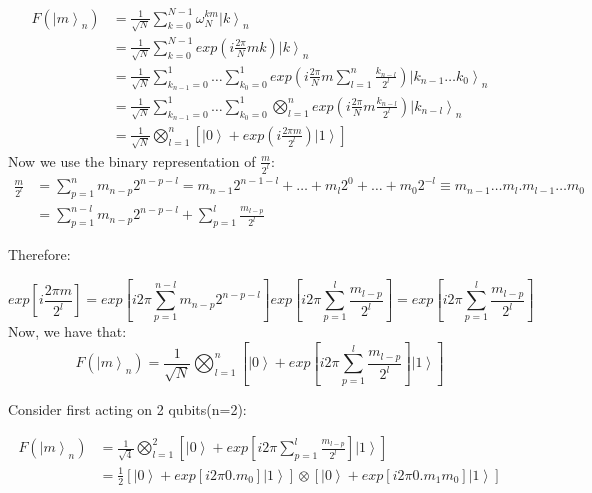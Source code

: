 \begin{equation}
\begin{split}
F\left(\left| m \right> _n\right) & = \frac{1}{\sqrt N} \sum_{k=0}^{N-1} \omega_N^{km} \left| k \right>_n \\
  & =  \frac{1}{\sqrt N} \sum_{k=0}^{N-1} exp\left( i \frac{2\pi}{N} mk \right) \left| k \right>_n  \\
  & =  \frac{1}{\sqrt N} \sum_{k_{n-1}=0}^{1} \dots \sum_{k_{0}=0}^{1} exp\left( i \frac{2\pi}{N} m \sum_{l=1}^n \frac{k_{n-l}}{2^l} \right) \left| k_{n-1} \dots k_0 \right>_n  \\
  & =  \frac{1}{\sqrt N} \sum_{k_{n-1}=0}^{1} \dots \sum_{k_{0}=0}^{1} \bigotimes_{l=1}^n exp\left( i \frac{2\pi}{N} m  \frac{k_{n-l}}{2^l} \right) \left| k_{n-l}\right>_n \\ 
  & =  \frac{1}{\sqrt N} \bigotimes_{l=1}^n \left[ \left| 0 \right> + exp\left( i \frac{2\pi m}{2^l} \right) \left| 1\right> \right]
\end{split}
\end{equation}
Now we use the binary representation of $\frac{m}{2^l}$: 
\begin{equation}
\begin{split}
\frac{m}{2^l} & = \sum_{p=1}^n m_{n-p} 2^{n-p-l}  = m_{n-1} 2^{n-1-l} + \dots + m_l 2^0 + \dots + m_0 2^{-l}  \equiv m_{n-1} \dots m_l . m_{l-1} \dots m_0 \\
 & = \sum_{p=1}^{n-l} m_{n-p} 2^{n-p-l} + \sum_{p=1}^{l} \frac{m_{l-p}}{2^l}  
\end{split}
\end{equation}

Therefore:

\begin{equation}
	exp\left[ i \frac{2 \pi m}{2^l} \right] = exp\left[ i 2 \pi \sum_{p=1}^{n-l} m_{n-p} 2^{n-p-l} \right] exp\left[i 2 \pi  \sum_{p=1}^{l} \frac{m_{l-p}}{2^l} \right] = exp\left[i 2 \pi  \sum_{p=1}^{l} \frac{m_{l-p}}{2^l} \right]
\end{equation}
Now, we have that:
\begin{equation}
F(\left| m\right>_n) = \frac{1}{\sqrt{N}} \bigotimes_{l=1}^n \left[ \left| 0 \right> +exp\left[i 2 \pi  \sum_{p=1}^{l} \frac{m_{l-p}}{2^l} \right] \left| 1\right> \right]
\end{equation}

Consider first acting on 2 qubits(n=2):

\begin{equation}
\begin{split}
F(\left| m\right>_n) & =  \frac{1}{\sqrt{4}} \bigotimes_{l=1}^2 \left[ \left| 0 \right> +exp\left[i 2 \pi  \sum_{p=1}^{l} \frac{m_{l-p}}{2^l} \right] \left| 1\right> \right] \\
 & = \frac{1}{2} \left[ \left| 0 \right> +exp\left[i 2 \pi  0.m_0 \right] \left| 1\right>\right] \otimes \left[ \left| 0 \right> +exp\left[i 2 \pi  0.m_1m_0 \right] \left| 1\right>\right]
\end{split}
\end{equation}

